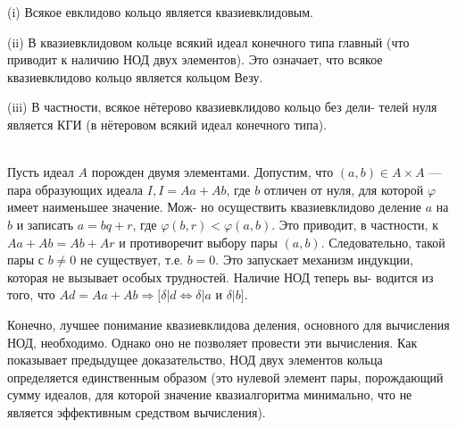 \hspace*{15cm}
\begin{predl}
\hspace*{0.5cm}
(i) Всякое евклидово кольцо является квазиевклидовым.

(ii) В квазиевклидовом кольце всякий идеал конечного типа главный\linebreak
(что приводит к наличию НОД двух элементов). Это означает, что\linebreak
всякое квазиевклидово кольцо является кольцом Везу.

(iii) В частности, всякое нётерово квазиевклидово кольцо без дели­-\linebreak
телей нуля является КГИ (в нётеровом всякий идеал конечного типа).
\end{predl}
\begin{myproof}
\\
Пусть идеал $A$ порожден двумя элементами. Допустим, что\linebreak
$(a, b)\in A \times A$ — пара образующих идеала $I, I = Aa + Ab$, где $b$\linebreak
отличен от нуля, для которой $\varphi$ имеет наименьшее значение. Мож-\linebreak
­но осуществить квазиевклидово деление $a$ на $b$ и записать $a=bq+r$,\linebreak
где $\varphi(b,r) < \varphi(a, b)$. Это приводит, в частности, к $Aa+Ab=Ab+Ar$\linebreak
и противоречит выбору пары $(a,b)$. Следовательно, такой пары с\linebreak
$b\neq0$ не существует, т.е. $b=0$. Это запускает механизм индукции,\linebreak
которая не вызывает особых трудностей. Наличие НОД теперь вы-\linebreak
водится из того, что $Ad = Aa + Ab \Rightarrow[\delta|d \Longleftrightarrow \delta|a$ и $\delta|b]$.
\end{myproof}
\newpage
\begin{mynotice}
Конечно, лучшее понимание квазиевклидова деления, основного для вычисления НОД, необходимо. Однако оно
не позволяет провести эти вычисления. Как показывает преды­дущее доказательство, НОД двух элементов кольца определяется
единственным образом (это нулевой элемент пары, порождающий
сумму идеалов, для которой значение квазиалгоритма минималь­но, что не является эффективным средством вычисления).\\
\end{mynotice}

